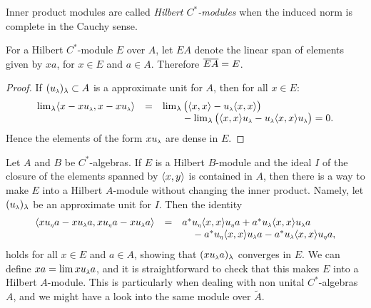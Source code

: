 \begin{definicao}
Inner product modules are called \textit{Hilbert \ensuremath{C^*}-modules} when the induced norm is complete in the Cauchy sense.
\end{definicao}

\begin{proposicao}\label{prop: EA = E}
For a Hilbert $C^*$-module $E$ over $A$, let $EA$ denote the linear span of elements given by $xa$, for $x\in E$ and $a\in A$. Therefore $\overline{EA} = E$.
\begin{proof}
If $(\sub u\lambda)_\lambda \subset A$ is a approximate unit for $A$, then for all $x\in E$:
\begin{equation*}
    \begin{array}{rcl}
        \lim_\lambda \inner{x-x\sub u\lambda}{x-x\sub u\lambda} &=& \lim_\lambda\big(\inner xx - \sub u\lambda \inner xx\big)  \\
        & & \hphantom{\lim_\lambda}- \lim_{\lambda} \big(\inner xx\sub u\lambda - \sub u\lambda \inner xx\sub u\lambda \big) = 0.
    \end{array}
\end{equation*}
Hence the elements of the form $x\sub u\lambda$ are dense in $E$. 
\end{proof}
\end{proposicao}

\begin{observacao}\label{obs: tornar um R-modulo em um K-modulo}
Let $A$ and $B$ be $C^*$-algebras. If $E$ is a Hilbert $B$-module and the ideal $I$ of the closure of the elements spanned by $\langle {x},{y}\rangle$ is contained in $A$, then there is a way to make $E$ into a Hilbert $A$-module without changing the inner product. Namely, let $(\sub u\lambda)_\lambda$ be an approximate unit for $I$. Then the identity
\begin{equation*}
\begin{array}{rcl}
    \inner{x \sub u\eta a-x \sub u\lambda a}{x \sub u\eta a-x \sub u\lambda a} &=& 
a^* \sub u\eta \inner xx \sub u\eta a+a^* \sub u\lambda \inner xx \sub u\lambda a \\ & & \hphantom{a^*}-a^* \sub u\eta \inner xx \sub u\lambda a-a^* \sub u\lambda \inner xx \sub u\eta a,
\end{array}
\end{equation*}
holds for all $x\in E$ and $a\in A$, showing that $(x\sub u\lambda a)_\lambda$ converges in $E$. We can define $x a=\lim x \sub u{\lambda} a$, and it is straightforward to check that this makes $E$ into a Hilbert $A$-module. This is particularly when dealing with non unital $C^*$-algebras $A$, and we might have a look into the same module over $\widetilde A$.
\end{observacao}

